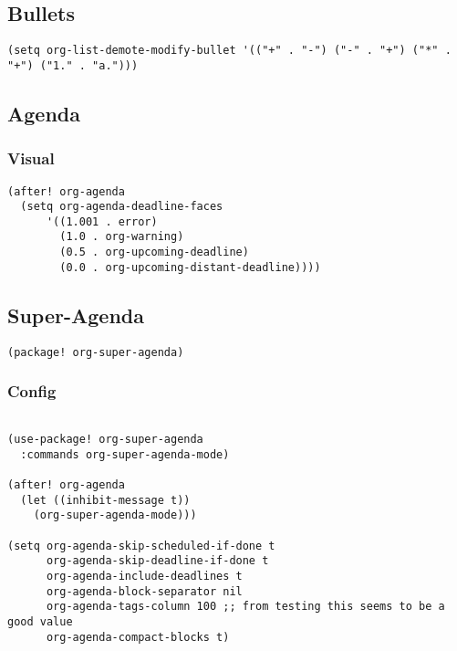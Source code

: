 \documentclass[c]{article}
\theoremstyle{plain}%
\theoremstyle{definition}
\theoremstyle{remark}
\begin{document}
\subsection{Bullets}
\label{sec:orgd1be9c2}
\begin{verbatim}
(setq org-list-demote-modify-bullet '(("+" . "-") ("-" . "+") ("*" . "+") ("1." . "a.")))
\end{verbatim}
\subsection{Agenda}
\label{sec:org0e8a9fd}
\subsubsection{Visual}
\label{sec:org3deb305}
\begin{verbatim}
(after! org-agenda
  (setq org-agenda-deadline-faces
      '((1.001 . error)
        (1.0 . org-warning)
        (0.5 . org-upcoming-deadline)
        (0.0 . org-upcoming-distant-deadline))))
\end{verbatim}
\subsection{Super-Agenda}
\label{sec:org5ef58ef}
\begin{verbatim}
(package! org-super-agenda)
\end{verbatim}
\subsubsection{Config}
\label{sec:orgf674bbc}
\begin{verbatim}

(use-package! org-super-agenda
  :commands org-super-agenda-mode)

(after! org-agenda
  (let ((inhibit-message t))
    (org-super-agenda-mode)))

(setq org-agenda-skip-scheduled-if-done t
      org-agenda-skip-deadline-if-done t
      org-agenda-include-deadlines t
      org-agenda-block-separator nil
      org-agenda-tags-column 100 ;; from testing this seems to be a good value
      org-agenda-compact-blocks t)
\end{verbatim}
\end{document}
